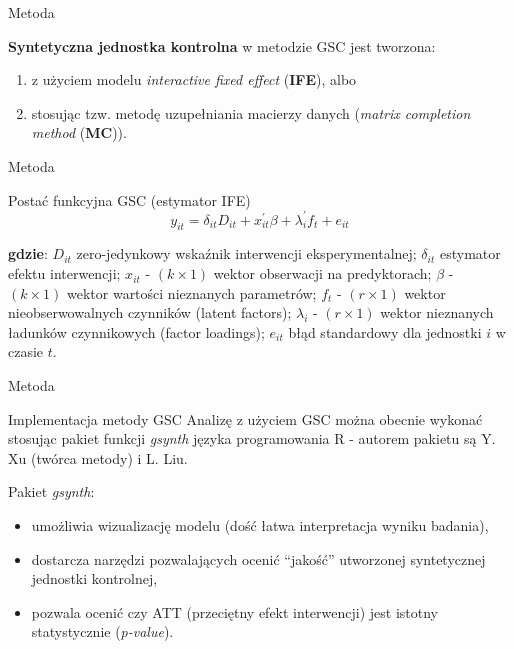 \documentclass[12pt]{beamer}
\begin{document}
\begin{frame}{Metoda}

\textbf{Syntetyczna jednostka kontrolna} w metodzie GSC jest tworzona:
\begin{enumerate}
\item z użyciem modelu \textit{interactive fixed effect} (\textbf{IFE}), albo
\item stosując tzw. metodę uzupełniania macierzy danych (\textit{matrix completion method} (\textbf{MC})).
\end{enumerate}

\end{frame}

\begin{frame}{Metoda}

\begin{block}{Postać funkcyjna GSC (estymator IFE)}
$$ y_{it} = \delta_{it} D_{it} + x_{it}^{'}\beta + \lambda_i^{'} f_t + e_{it} $$

\scriptsize

\textbf{gdzie}: $D_{it}$ zero-jedynkowy wskaźnik interwencji eksperymentalnej; $\delta_{it}$ estymator efektu interwencji; $x_{it}$ - $(k \times 1)$ wektor obserwacji na predyktorach; $\beta$ - $(k \times 1)$ wektor wartości nieznanych parametrów; $f_t$ - $(r \times 1)$ wektor nieobserwowalnych czynników (latent factors); $\lambda_i$ - $(r \times 1)$ wektor nieznanych ładunków czynnikowych (factor loadings); $e_{it}$ błąd standardowy dla jednostki $i$ w czasie $t$.
\end{block}

\end{frame}

\begin{frame}{Metoda}

\begin{block}{Implementacja metody GSC}
Analizę z użyciem GSC można obecnie wykonać stosując pakiet funkcji \textit{gsynth} języka programowania R - autorem pakietu są Y. Xu (twórca metody) i L. Liu.
\end{block}

Pakiet \textit{gsynth}:
\begin{itemize}
\item umożliwia wizualizację modelu (dość łatwa interpretacja wyniku badania),
\item dostarcza narzędzi pozwalających ocenić ``jakość'' utworzonej syntetycznej jednostki kontrolnej,
\item pozwala ocenić czy ATT (przeciętny efekt interwencji) jest istotny statystycznie (\textit{p-value}).
\end{itemize}

\end{frame}
\end{document}
